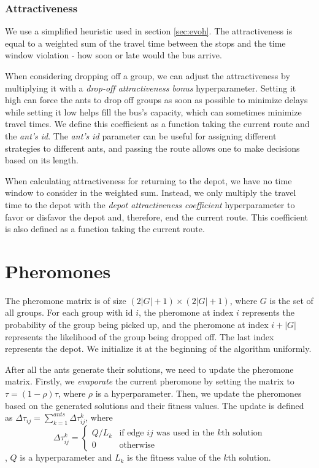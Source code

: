 \subsubsection{Attractiveness}

We use a simplified heuristic used in section \ref{sec:evoh}. The attractiveness is equal to a weighted sum of the travel time between the stops and the time window violation - how soon or late would the bus arrive.

When considering dropping off a group, we can adjust the attractiveness by multiplying it with a \textit{drop-off attractiveness bonus} hyperparameter. Setting it high can force the ants to drop off groups as soon as possible to minimize delays while setting it low helps fill the bus's capacity, which can sometimes minimize travel times. We define this coefficient as a function taking the current route and the \textit{ant's id}. The \textit{ant's id} parameter can be useful for assigning different strategies to different ants, and passing the route allows one to make decisions based on its length.

When calculating attractiveness for returning to the depot, we have no time window to consider in the weighted sum. Instead, we only multiply the travel time to the depot with the \textit{depot attractiveness coefficient} hyperparameter to favor or disfavor the depot and, therefore, end the current route. This coefficient is also defined as a function taking the current route.

\section{Pheromones}

The pheromone matrix is of size $(2|G| + 1) \times (2|G| + 1)$, where $G$ is the set of all groups. For each group with id $i$, the pheromone at index $i$ represents the probability of the group being picked up, and the pheromone at index $i + |G|$ represents the likelihood of the group being dropped off. The last index represents the depot. We initialize it at the beginning of the algorithm uniformly.

After all the ants generate their solutions, we need to update the pheromone matrix. Firstly, we \textit{evaporate} the current pheromone by setting the matrix to $\tau = (1 - \rho)\tau$, where $\rho$ is a hyperparameter. Then, we update the pheromones based on the generated solutions and their fitness values. The update is defined as $\Delta\tau_{ij} = \sum_{k=1}^{ants}\Delta\tau_{ij}^{k}$, where
\begin{equation}
    \Delta\tau_{ij}^{k} = 
        \begin{cases}
        Q / L_k & \text{if edge $ij$ was used in the $k$th solution} \\
        0 & \text{otherwise}
        \end{cases}
\end{equation},
$Q$ is a hyperparameter and $L_k$ is the fitness value of the $k$th solution.

